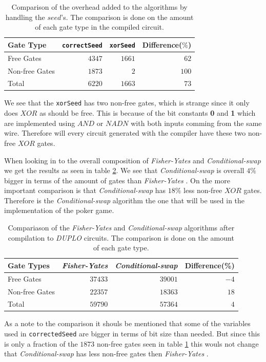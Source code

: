 \documentclass[twoside,11pt,openright]{report}
\newcommand{\FY}{\textit{Fisher-Yates} }
\newcommand{\CS}{\textit{Conditional-swap} }
\newcommand{\DUPLO}{\textit{DUPLO} }
\begin{document}
\begin{table}
\centering
\begin{tabular}{l || r r r}
Gate Type      & \verb|correctSeed| & \verb|xorSeed| & Difference($\%$)    \\
\hline
Free Gates     & $4347$             & $1661$         &  $62$ \\
Non-free Gates & $1873$             &    $2$         & $100$ \\
\hline
Total          & $6220$             & $1663$         &  $73$
\end{tabular}
\caption{Comparison of the overhead added to the algorithms by handling the $seed$'s. The comparison is done on the amount of each gate type in the compiled circuit.}
\label{table:alg_preprocess_overhead}
\end{table}

We see that the \verb|xorSeed| has two non-free gates, which is strange since it only does $XOR$ as should be free. This is because of the bit constants \textbf{0} and \textbf{1} which are implemented using $AND$ or $NADN$ with both inputs comming from the same wire. Therefore will every circuit generated with the compiler have these two non-free $XOR$ gates.

\bigskip

When looking in to the overall composition of \FY and \CS we get the results as seen in table \ref{table:circuit_comp}. We see that \CS is overall $4\%$ bigger in terms of the amount of gates than \FY. On the more important comparison is that \CS has $18\%$ less non-free $XOR$ gates. Therefore is the \CS algorithm the one that will be used in the implementation of the poker game.

\begin{table}
\centering
\begin{tabular}{l || r | r | r}
Gate Types     & \FY     & \CS     & Difference(\%) \\
\hline
Free Gates     & $37433$ & $39001$ & $-4$   \\
Non-free Gates & $22357$ & $18363$ & $18$   \\
\hline
Total          & $59790$ & $57364$ &  $4$
\end{tabular}
\caption{Compariason of the \FY and \CS algorithms after compilation to \DUPLO circuits. The comparison is done on the amount of each gate type.}
\label{table:circuit_comp}
\end{table}

As a note to the comparison it shouls be mentioned that some of the variables used in \verb|correctedSeed| are bigger in terms of bit size than needed. But since this is only a fraction of the $1873$ non-free gates seen in table \ref{table:alg_preprocess_overhead} this wouls not change that \CS has less non-free gates then \FY.
\end{document}
